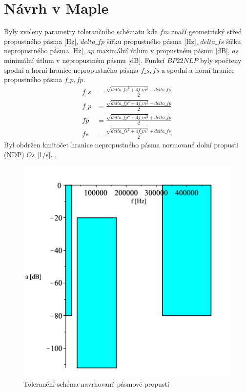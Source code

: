\documentclass[twoside]{article}
\begin{document}
\section{Návrh v Maple}
Byly zvoleny parametry tolerančního schématu 
\noindent kde $fm$ značí geometrický střed propustného pásma [Hz], $delta\_{fp}$ šířku propustného pásma [Hz],
$delta\_{fs} $ šířku nepropustného pásma [Hz], $ap$ maximální útlum v propustném pásmu [dB], $as$ minimální útlum v nepropustném pásmu [dB].
Funkcí $BP22NLP$ byly spočteny spodní a horní hranice nepropustného pásma $f\_s,fs$ a spodní a horní hranice propustného pásma $f\_p,fp$.
\begin{align}
f\_s &= \frac{\sqrt{delta\_{fs}^2+4f\_m ^2}-delta\_{fs}}{2}\\
f\_p &= \frac{\sqrt{delta\_{fp}^2+4f\_m ^2}-delta\_{fp}}{2}\\
fp &= \frac{\sqrt{delta\_{fp}^2+4f\_m ^2}+delta\_{fp}}{2}\\
fs &= \frac{\sqrt{delta\_{fs}^2+4f\_m ^2}+delta\_{fs}}{2}
\end{align}
\noindent Byl obdržen kmitočet hranice nepropustného pásma normované dolní propusti (NDP) $Os$ [1/s].
.
\begin{figure}[H]
\centering
\includegraphics[scale=0.7]{tolsch.png}
\caption{Toleranční schéma navrhované pásmové propusti}
\end{figure}
\end{document}
